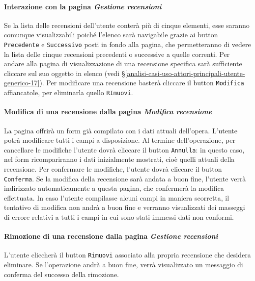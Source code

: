 \paragraph{Interazione con la pagina \textit{Gestione recensioni}}
\label{analisi-casi-uso-attori-principali-utente-autenticato-6}
Se la lista delle recensioni dell'utente conterà più di cinque elementi, esse saranno comunque visualizzabili poiché l'elenco sarà navigabile grazie ai button \texttt{Precedente} e \texttt{Successivo} posti in fondo alla pagina, che permetteranno di vedere la lista delle cinque recensioni precedenti o successive a quelle correnti. Per andare alla pagina di visualizzazione di una recensione specifica sarà sufficiente cliccare sul suo oggetto in elenco (vedi §\ref{analisi-casi-uso-attori-principali-utente-generico-17}). Per modificare una recensione basterà cliccare il button \texttt{Modifica} affiancatole, per eliminarla quello \texttt{RImuovi}.


\paragraph{Modifica di una recensione dalla pagina \textit{Modifica recensione}}
\label{analisi-casi-uso-attori-principali-utente-autenticato-7}
La pagina offrirà un form già compilato con i dati attuali dell'opera. L'utente potrà modificare tutti i campi a disposizione. Al termine dell'operazione, per cancellare le modifiche l'utente dovrà cliccare il button \texttt{Annulla}: in questo caso, nel form ricompariranno i dati inizialmente mostrati, cioè quelli attuali della recensione. Per confermare le modifiche, l'utente dovrà cliccare il button \texttt{Conferma}. Se la modifica della recensione sarà andata a buon fine, l'utente verrà indirizzato automaticamente a questa pagina, che confermerà la modifica effettuata. In caso l'utente compilasse alcuni campi in maniera scorretta, il tentativo di modifica non andrà a buon fine e verranno visualizzati dei masseggi di errore relativi a tutti i campi in cui sono stati immessi dati non conformi.


\paragraph{Rimozione di una recensione dalla pagina \textit{Gestione recensioni}}
\label{analisi-casi-uso-attori-principali-utente-autenticato-8}
L'utente cliccherà il button \texttt{Rimuovi} associato alla propria recensione che desidera eliminare. Se l'operazione andrà a buon fine, verrà visualizzato un messaggio di conferma del successo della rimozione.


